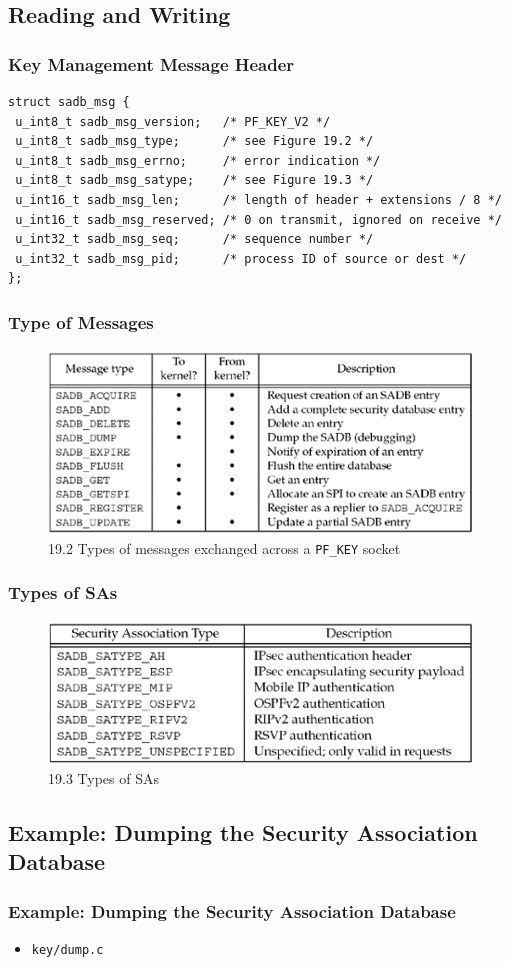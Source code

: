 \documentclass[notes,serif]{beamer}
\begin{document}
\subsection{Reading and Writing}
\begin{frame}[containsverbatim]
  \frametitle{Key Management Message Header}
  {\scriptsize
  \begin{verbatim}
struct sadb_msg {
 u_int8_t sadb_msg_version;   /* PF_KEY_V2 */
 u_int8_t sadb_msg_type;      /* see Figure 19.2 */
 u_int8_t sadb_msg_errno;     /* error indication */
 u_int8_t sadb_msg_satype;    /* see Figure 19.3 */
 u_int16_t sadb_msg_len;      /* length of header + extensions / 8 */
 u_int16_t sadb_msg_reserved; /* 0 on transmit, ignored on receive */
 u_int32_t sadb_msg_seq;      /* sequence number */
 u_int32_t sadb_msg_pid;      /* process ID of source or dest */
};
  \end{verbatim}
  }
\end{frame}

\begin{frame}
  \frametitle{Type of Messages}
  \begin{figure}
    \includegraphics[width=.7\textwidth]{figs/19fig02}
    \caption{19.2 Types of messages exchanged across a \texttt{PF\_KEY} socket}
  \end{figure}
\end{frame}

\begin{frame}
  \frametitle{Types of SAs}
  \begin{figure}
    \includegraphics[width=.7\textwidth]{figs/19fig03}
    \caption{19.3 Types of SAs}
  \end{figure}
\end{frame}

\subsection{Example: Dumping the Security Association Database}
\begin{frame}
  \frametitle{Example: Dumping the Security Association Database}
\begin{itemize}
  \item \texttt{key/dump.c}
\end{itemize}
\end{frame}
\end{document}
